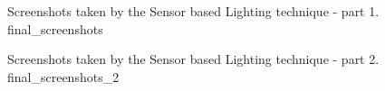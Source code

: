 \documentclass[10pt, conference]{IEEEtran}
\begin{document}




\subimages
	{Screenshots taken by the Sensor based Lighting technique - part 1.}
	{final_screenshots}{
}

\subimages
	{Screenshots taken by the Sensor based Lighting technique - part 2.}
	{final_screenshots_2}{
}
\end{document}
